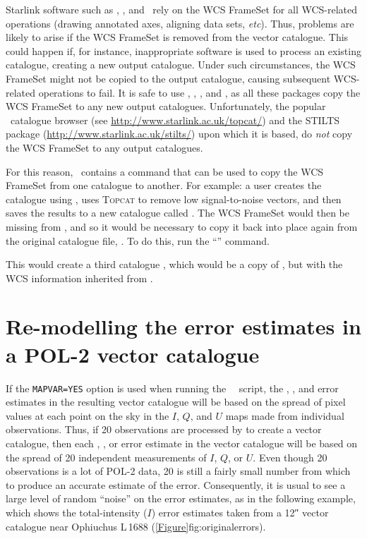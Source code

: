 Starlink software such as \polpack, \Kappa, and \gaia\ rely on the WCS
FrameSet for all WCS-related operations (drawing annotated axes, aligning
data sets, \emph{etc}). Thus, problems are likely to arise if the WCS FrameSet
is removed from the vector catalogue. This could happen if, for instance,
inappropriate software is used to process an existing catalogue, creating a
new output catalogue. Under such circumstances, the WCS FrameSet might
not be copied to the output catalogue, causing subsequent WCS-related
operations to fail. It is safe to use \POLPACK, \KAPPA, \GAIA, and
\CURSAref, as all these packages copy the WCS
FrameSet to any new output catalogues. Unfortunately, the popular
\topcat\ catalogue browser (see
\url{http://www.starlink.ac.uk/topcat/}) and the STILTS package
(\url{http://www.starlink.ac.uk/stilts/}) upon which it is based, do
\emph{not} copy the WCS FrameSet to any output catalogues.

For this reason, \POLPACK\ contains a command that can be used to copy the
WCS FrameSet from one catalogue to another.  For example: a user creates
the catalogue  using \poltwomap, uses \textsc{Topcat}
to remove low signal-to-noise vectors, and then saves the results to a new catalogue
called . The WCS FrameSet would then be missing from ,
and so it would be necessary to copy it back into place again from the original catalogue
file, . To do this, run the ``''
command.

\begin{terminalv}
\end{terminalv}

This would create a third catalogue , which would be a copy of
, but with the WCS information inherited from .


\section{Re-modelling the error estimates in a POL-2 vector catalogue}

If the \texttt{MAPVAR=YES} option is used when running the \smurf\ \poltwomap\ script,
the , , and  error estimates in the resulting vector catalogue will be based
on the spread of pixel values at each point on the sky in the $I$,
$Q$, and $U$ maps made from individual observations. Thus, if 20 observations are
processed by  to create a vector catalogue, then each
, , or  error estimate in the vector catalogue will be based on the spread of 20
independent measurements of $I$, $Q$, or $U$.  Even though 20 observations is a lot of
POL-2 data, 20 is still a fairly small number from which to produce an accurate
estimate of the error. Consequently, it is usual to see a large level of random
``noise'' on the error estimates, as in the following example, which
shows the total-intensity ($I$) error estimates taken from a 12\si{\arcsecond} vector
catalogue near Ophiuchus L\,1688 (\cref{Figure}{fig:originalerrors}{}).

